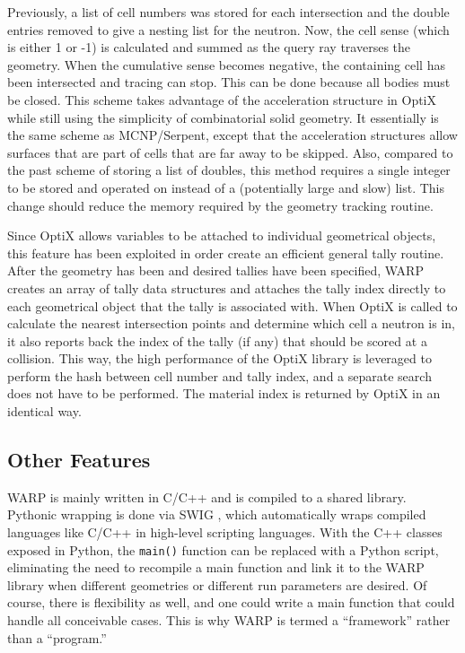 \documentclass[preprint,12pt]{elsarticle}
\begin{document}
Previously, a list of cell numbers was stored for each intersection and the double entries removed to give a nesting list for the neutron.  Now, the cell sense (which is either 1 or -1) is calculated and summed as the query ray traverses the geometry.  When the cumulative sense becomes negative, the containing cell has been intersected and tracing can stop.  This can be done because all bodies must be closed.  This scheme takes advantage of the acceleration structure in OptiX while still using the simplicity of combinatorial solid geometry.  It essentially is the same scheme as MCNP/Serpent, except that the acceleration structures allow surfaces that are part of cells that are far away to be skipped.  Also, compared to the past scheme of storing a list of doubles, this method requires a single integer to be stored and operated on instead of a (potentially large and slow) list. This change should reduce the memory required by the geometry tracking routine.

Since OptiX allows variables to be attached to individual geometrical objects, this feature has been exploited in order create an efficient general tally routine.  After the geometry has been and desired tallies have been specified, WARP creates an array of tally data structures and attaches the tally index directly to each geometrical object that the tally is associated with.  When OptiX is called to calculate the nearest intersection points and determine which cell a neutron is in, it also reports back the index of the tally (if any) that should be scored at a collision.  This way, the high performance of the OptiX library is leveraged to perform the hash between cell number and tally index, and a separate search does not have to be performed.  The material index is returned by OptiX in an identical way.

\subsection{Other Features}

WARP is mainly written in C/C++ and is compiled to a shared library.  Pythonic wrapping is done via SWIG \cite{swig}, which automatically wraps compiled languages like C/C++ in high-level scripting languages.  With the C++ classes exposed in Python, the \texttt{main()} function can be replaced with a Python script, eliminating the need to recompile a main function and link it to the WARP library when different geometries or different run parameters are desired.  Of course, there is flexibility as well, and one could write a main function that could handle all conceivable cases.  This is why WARP is termed a ``framework'' rather than a ``program.''
\end{document}
